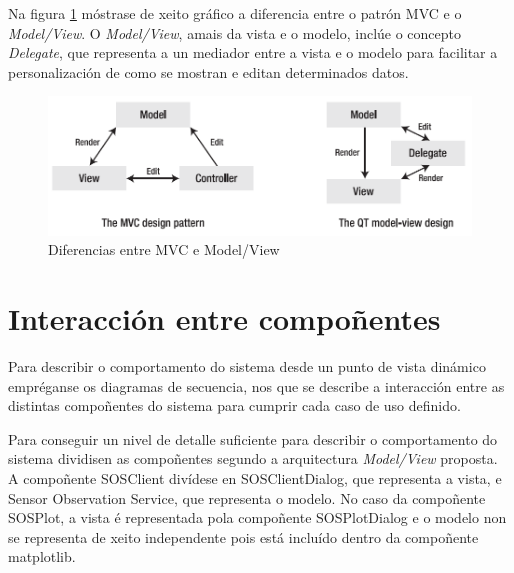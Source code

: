 Na figura \ref{fig:MVCvsMV} móstrase de xeito gráfico a diferencia entre o patrón MVC e o \emph{Model/View}. O \emph{Model/View}, amais da vista e o modelo, inclúe o concepto \emph{Delegate}, que representa a un mediador entre a vista e o modelo para facilitar a personalización de como se mostran e editan determinados datos.

\begin{figure}[hbtp]
 \centering
 \includegraphics[width=\textwidth]{images/MVCvsMV.png}
 \caption{Diferencias entre MVC e Model/View}
 \label{fig:MVCvsMV}
\end{figure}

\section{Interacción entre compoñentes}
Para describir o comportamento do sistema desde un punto de vista dinámico empréganse os diagramas de secuencia, nos que se describe a interacción entre as distintas compoñentes do sistema para cumprir cada caso de uso definido.

Para conseguir un nivel de detalle suficiente para describir o comportamento do sistema dividisen as compoñentes segundo a arquitectura \emph{Model/View} proposta. A compoñente SOSClient divídese en SOSClientDialog, que representa a vista, e Sensor Observation Service, que representa o modelo. No caso da compoñente SOSPlot, a vista é representada pola compoñente SOSPlotDialog e o modelo non se representa de xeito independente pois está incluído dentro da compoñente matplotlib.


